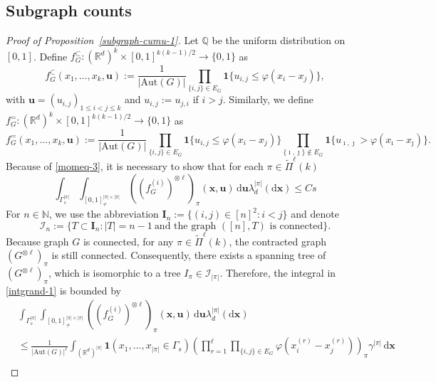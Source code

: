 \documentclass{article}
\theoremstyle{definition}
\numberwithin{equation}{section}
\theoremstyle{remark}
\newcommand{\R}{\mathbb{R}}
\begin{document}
\subsection{Subgraph counts}
 \begin{proof}[Proof of Proposition~\ref{subgraph-cumu-1}]
	Let $\mathbb{Q}$ be the uniform distribution on $[0,1]$. 
Define $f^{\subset}_G:(\R^d)^k\times [0,1]^{k(k-1)/2}\to\{0,1\}$ as 
\begin{equation}
	f^{\subset}_G(x_1,\dots,x_k,\mathbf{u}):=\frac1{|\mathrm{Aut}(G)|}\prod_{\{i,j\}\in E_G}\mathbf{1}\{u_{i,j}\le\varphi(x_i-x_j)\},
\end{equation}
with $\mathbf{u}=(u_{i,j})_{1\le i<j\le k}$ and $u_{i,j}:=u_{j,i}$ if $i>j$. 
Similarly, we define 
$f^{=}_G:(\R^d)^k\times [0,1]^{k(k-1)/2}\to\{0,1\}$ as 
\begin{equation}
	f^{=}_G(x_1,\dots,x_k,\mathbf{u}):=\frac1{|\mathrm{Aut}(G)|}\prod_{\{i,j\}\in E_G}\mathbf{1}\{u_{i,j}\le\varphi(x_i-x_j)\}\prod_{\{\imath,\jmath\}\notin E_G}\mathbf{1}\{u_{\imath,\jmath}>\varphi(x_{\imath}-x_{\jmath})\}.
\end{equation}
	Because of \eqref{momeq-3}, it is necessary to show that for each $\pi\in\widetilde{\Pi}^\ell(k)$
	\begin{equation}\label{intgrand-1}
		\int_{\Gamma_s^{|\pi|}}\int_{[0,1]^{|\pi|\times|\pi|}_{\ne}}((f^{(i)}_G)^{\otimes\ell})_{\pi}(\bm{x},\bm{u})\,\mathrm{d}\bm{u}\lambda_d^{|\pi|}(\mathrm{d}\bm{x})\le C s
\end{equation}
For $n\in\mathbb{N}$, we use the abbreviation $\mathbf{I}_n:=\{(i,j)\in[n]^2:i<j\}$ and denote 
\begin{equation*}
	\mathcal{I}_n:=\{T\subset\mathbf{I}_n:|T|=n-1~\mbox{and the graph $([n],T)$ is connected}\}.
\end{equation*}
Because graph $G$ is connected, for any $\pi\in\widetilde{\Pi}^\ell(k)$, the contracted graph $(G^{\otimes\ell})_{\pi}$ is still connected. 
Consequently, there exists a spanning tree of $(G^{\otimes \ell})_{\pi}$, which is isomorphic to a tree $I_{\pi}\in\mathcal{I}_{|\pi|}$.
Therefore, the integral in \eqref{intgrand-1} is bounded by 
\begin{align}
	&\int_{\Gamma_s^{|\pi|}}\int_{[0,1]^{|\pi|\times|\pi|}_{\ne}}((f^{(i)}_G)^{\otimes\ell})_{\pi}(\bm{x},\bm{u})\,\mathrm{d}\bm{u}\lambda_d^{|\pi|}(\mathrm{d}\bm{x})\nonumber\\
	&\le\frac1{|\mathrm{Aut}(G)|^\ell}\int_{(\mathbb{R}^d)^{|\pi|}}\mathbf{1}(x_1,\dots,x_{|\pi|}\in\Gamma_s)\left(\prod_{r=1}^\ell\prod_{\{i,j\}\in E_G}\varphi\left(x_i^{(r)}-x_j^{(r)}\right)\right)_{\pi}\gamma^{|\pi|}\,\mathrm{d}\bm{x}\nonumber\\

\end{align}
\end{proof}
\end{document}
